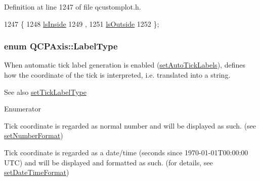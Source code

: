 Definition at line 1247 of file qcustomplot.\+h.


\begin{DoxyCode}
1247                  \{
1248     \hyperlink{class_q_c_p_axis_a24b13374b9b8f75f47eed2ea78c37db9aae7b027ac2839cf4ad611df30236fc3f}{lsInside} 
1249     ,
1251     \hyperlink{class_q_c_p_axis_a24b13374b9b8f75f47eed2ea78c37db9a2eadb509fc0c9a8b35b85c86ec9f3c7a}{lsOutside} 
1252   \};
\end{DoxyCode}
\hypertarget{class_q_c_p_axis_a4a7da0166f755f5abac23b765d184cad}{}
\subsubsection[{Label\+Type}]{\setlength{\rightskip}{0pt plus 5cm}enum {\bf Q\+C\+P\+Axis\+::\+Label\+Type}}\label{class_q_c_p_axis_a4a7da0166f755f5abac23b765d184cad}
When automatic tick label generation is enabled (\hyperlink{class_q_c_p_axis_aaa47e3a6bac0c20d4beb9028f01bc1a1}{set\+Auto\+Tick\+Labels}), defines how the coordinate of the tick is interpreted, i.\+e. translated into a string.

\begin{DoxySeeAlso}{See also}
\hyperlink{class_q_c_p_axis_a54f24f5ce8feea25209388a863d7e448}{set\+Tick\+Label\+Type} 
\end{DoxySeeAlso}
\begin{Desc}
\item[Enumerator]\par
\begin{description}
\item[{\em 
\hypertarget{class_q_c_p_axis_a4a7da0166f755f5abac23b765d184cada7f1eacf3b73adaefd334bea04e094b7e}{}lt\+Number\label{class_q_c_p_axis_a4a7da0166f755f5abac23b765d184cada7f1eacf3b73adaefd334bea04e094b7e}
}]Tick coordinate is regarded as normal number and will be displayed as such. (see \hyperlink{class_q_c_p_axis_ae585a54dc2aac662e90a2ca82f002590}{set\+Number\+Format}) \item[{\em 
\hypertarget{class_q_c_p_axis_a4a7da0166f755f5abac23b765d184cadafc70594a9d877124dd11ccc187d4ac52}{}lt\+Date\+Time\label{class_q_c_p_axis_a4a7da0166f755f5abac23b765d184cadafc70594a9d877124dd11ccc187d4ac52}
}]Tick coordinate is regarded as a date/time (seconds since 1970-\/01-\/01\+T00\+:00\+:00 U\+T\+C) and will be displayed and formatted as such. (for details, see \hyperlink{class_q_c_p_axis_a2ee0191daa03524a682113e63e05f7a7}{set\+Date\+Time\+Format}) \end{description}
\end{Desc}


